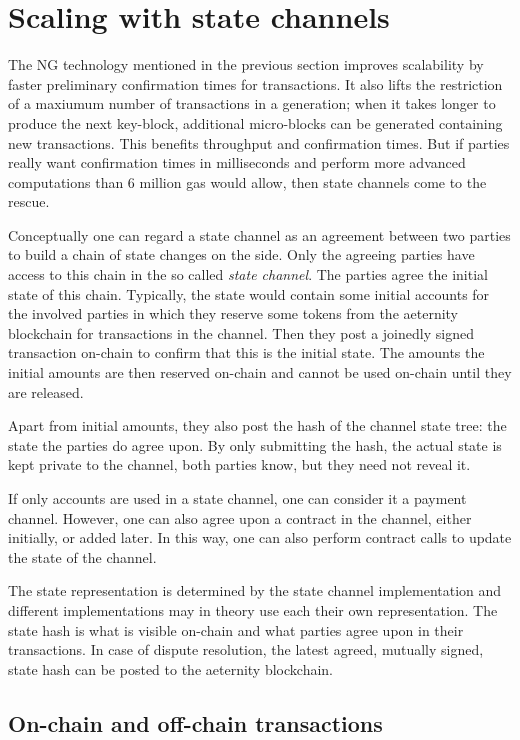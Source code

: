 \section{Scaling with state channels}
\label{sect:channels}

The NG technology mentioned in the previous section improves
scalability by faster preliminary confirmation times for
transactions. It also lifts the restriction of a maxiumum number of transactions in a
generation; when it takes longer to produce the next key-block,
additional micro-blocks can be generated containing new transactions.
This benefits throughput and confirmation times. But if parties really
want confirmation times in milliseconds and perform more advanced
computations than 6 million gas would allow, then state channels come to the rescue.

Conceptually one can regard a state channel as an agreement between
two parties to build a chain of state changes on the side. Only the
agreeing parties have access to this chain in the so called
\textit{state channel}. The parties agree the initial
state of this chain. Typically, the state would
contain some initial accounts for the involved parties in which they
reserve some tokens from the aeternity blockchain for transactions in
the channel. Then they post a joinedly signed transaction on-chain to
confirm that this is the initial state.
The amounts the initial amounts are then reserved on-chain and cannot
be used on-chain until they are released.

Apart from initial amounts,
they also post the hash of the channel state tree: the state the
parties do agree upon. By only submitting the hash, the actual state
is kept private to the channel, both parties know, but they need not
reveal it.

If only accounts are used in a state channel, one can consider it a
payment channel. However, one can also agree upon a contract in the
channel, either initially, or added later. In this way, one can also
perform contract calls to update the state of the channel.

The state representation is determined by the state channel
implementation and different implementations may in theory use each
their own representation. The state hash is what is visible on-chain
and what parties agree upon in their transactions.
In case of dispute resolution, the
latest agreed, mutually signed, state hash can be posted to the aeternity blockchain.

\subsection{On-chain and off-chain transactions}


